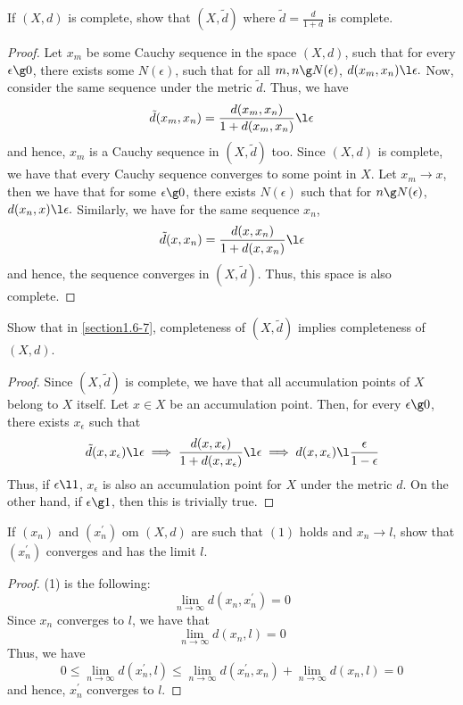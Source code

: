\begin{question}
    If $(X,d)$ is complete, show that $(X, \tilde{d})$ where $\tilde{d} = \frac{d}{1+d}$ is complete.
    \label{section1.6-7}
\end{question}
\begin{proof}
    Let $x_m$ be some Cauchy sequence in the space $(X,d)$, such that for every $\epsilon \g 0$, there exists some $N(\epsilon)$, such that for all $m , n \g N(\epsilon)$, $d(x_m  ,x_n) \l \epsilon.$ Now, consider the same sequence under the metric $\tilde{d}$. Thus, we have
    \[\tilde{d}(x_m , x_n) = \frac{d(x_m,x_n)}{1 + d(x_m , x_n)} \l \epsilon\]
    and hence, $x_m$ is a Cauchy sequence in $(X,\tilde{d})$ too. Since $(X,d)$ is complete, we have that every Cauchy sequence converges to some point in $X$. Let $x_m \rightarrow x$, then we have that for some $\epsilon \g 0$, there exists $N(\epsilon)$ such that for $n \g N(\epsilon)$, $d(x_n,x) \l \epsilon.$ Similarly, we have for the same sequence $x_n$, 
    \[\tilde{d}(x , x_n) = \frac{d(x,x_n)}{1 + d(x , x_n)} \l \epsilon\]
    and hence, the sequence converges in $(X,\tilde{d})$. Thus, this space is also complete.
\end{proof}

\begin{question}
    Show that in \ref{section1.6-7}, completeness of $(X,\tilde{d})$ implies completeness of $(X,d)$.
    \label{section1.6-8}
\end{question}
\begin{proof}
    Since $(X,  \tilde{d})$ is complete, we have that all accumulation points of $X$ belong to $X$ itself. Let $x \in X$ be an accumulation point. Then, for every $\epsilon \g 0$, there exists $x_\epsilon$ such that
    \[\tilde{d}(x , x_\epsilon) \l \epsilon \implies \frac{d(x,  x_\epsilon)}{1 + d(x , x_\epsilon )} \l \epsilon \implies d(x , x_\epsilon) \l \frac{\epsilon}{1 - \epsilon}\]
    Thus, if $\epsilon \l 1$, $x_\epsilon$ is also an accumulation point for $X$ under the metric $d$. On the other hand, if $\epsilon \g 1$, then this is trivially true.
\end{proof}

\begin{question}
    If $(x_n)$ and $(x_n^\prime)$ om $(X,d)$  are such that $(1)$ holds and $x_n \rightarrow l$, show that $(x_n^\prime)$ converges and has the limit $l$.
    \label{section1.6-9}
\end{question}
\begin{proof}
    (1) is the following: 
    \[\lim_{n \rightarrow \infty} d(x_n,x_n^\prime) = 0\]
    Since $x_n$ converges to $l$, we have that
    \[\lim_{n \rightarrow \infty} d(x_n,l) = 0\]
    Thus, we have
    \[0 \leq \lim_{n \rightarrow \infty} d(x_n^\prime , l) \leq \lim_{n \rightarrow \infty} d(x_n^\prime , x_n) + \lim_{n \rightarrow \infty} d(x_n , l) = 0\]
    and hence, $x_n^\prime$ converges to $l$.
\end{proof}

